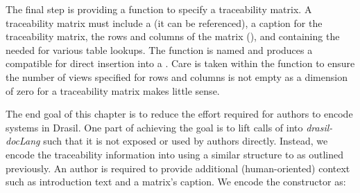 

The final step is providing a function to specify a traceability matrix. A traceability matrix must include a  (it can be referenced), a caption for the traceability matrix, the rows and columns of the matrix (), and  containing the  needed for various table lookups. The function is named  and produces a  compatible for direct insertion into a . Care is taken within the function to ensure the number of views specified for rows and columns is not empty as a dimension of zero for a traceability matrix makes little sense.

The end goal of this chapter is to reduce the effort required for authors to encode systems in Drasil. One part of achieving the goal is to lift calls of  into \textit{drasil-docLang} such that it is not exposed or used by authors directly. Instead, we encode the traceability information into  using a similar structure to  as outlined previously. An author is required to provide additional (human-oriented) context such as introduction text and a matrix's caption. We encode the  constructor as:


